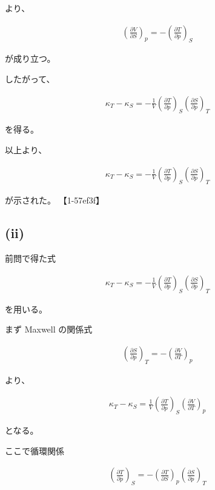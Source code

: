 \documentclass[platex,dvipdfmx,a4paper]{jsarticle}
\begin{document}
より、

\begin{align*}
\left(
\frac{\partial V}{\partial S}
\right)_p
=
-
\left(
\frac{\partial T}{\partial p}
\right)_S
\end{align*}

が成り立つ。

したがって、

\begin{align*}
\kappa_T-\kappa_S
=
-\frac1V
\left(
\frac{\partial T}{\partial p}
\right)_S
\left(
\frac{\partial S}{\partial p}
\right)_T
\end{align*}

を得る。

以上より、

\begin{align*}
\boxed{
\kappa_T-\kappa_S
=
-\frac1V
\left(
\frac{\partial T}{\partial p}
\right)_S
\left(
\frac{\partial S}{\partial p}
\right)_T
}
\end{align*}

が示された。 【1-57ef3f】

\subsection{(ii)}

前問で得た式

\begin{align*}
\kappa_T-\kappa_S
=
-\frac1V
\left(
\frac{\partial T}{\partial p}
\right)_S
\left(
\frac{\partial S}{\partial p}
\right)_T
\end{align*}

を用いる。

まず Maxwell の関係式

\begin{align*}
\left(
\frac{\partial S}{\partial p}
\right)_T
=
-
\left(
\frac{\partial V}{\partial T}
\right)_p
\end{align*}

より、

\begin{align*}
\kappa_T-\kappa_S
=
\frac1V
\left(
\frac{\partial T}{\partial p}
\right)_S
\left(
\frac{\partial V}{\partial T}
\right)_p
\end{align*}

となる。

ここで循環関係

\begin{align*}
\left(
\frac{\partial T}{\partial p}
\right)_S
=
-
\left(
\frac{\partial T}{\partial S}
\right)_p
\left(
\frac{\partial S}{\partial p}
\right)_T
\end{align*}
\end{document}
